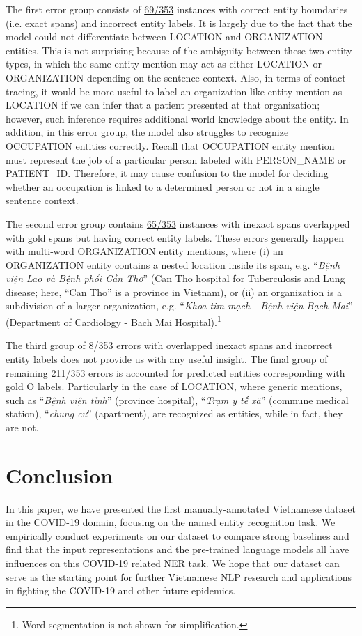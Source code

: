 \documentclass[11pt]{article}
\begin{document}
The first error group consists of \underline{69/353}  instances with correct entity boundaries (i.e. exact spans) and incorrect entity labels. It is largely due to the fact that the model could not differentiate between LOCATION and ORGANIZATION entities. 
This is not surprising because of the ambiguity between these two entity types, in which the same entity mention may act as either LOCATION or ORGANIZATION depending on the sentence context. Also, in terms of contact tracing, it would be more useful to label an organization-like entity mention as LOCATION if we can infer that a patient presented at that organization; however, such inference requires additional world knowledge about the entity. 
In addition, in this error group, the model also struggles to recognize OCCUPATION entities correctly. Recall that OCCUPATION entity mention must represent the job of a particular person labeled with PERSON\_NAME or PATIENT\_ID.
Therefore, it may cause confusion to the model for deciding whether an occupation is linked to a determined person or not in a single sentence context.

The second error group contains \underline{65/353} instances with inexact spans overlapped with gold spans but having correct entity labels. 
These errors generally happen with multi-word ORGANIZATION entity mentions, where (i) an ORGANIZATION entity contains a nested location inside its span, e.g.  ``\textit{Bệnh viện Lao và Bệnh phổi Cần Thơ}'' ({Can Tho hospital for Tuberculosis and Lung disease}; here, ``Can Tho'' is a province in Vietnam), or (ii) an organization is a subdivision of a larger organization, e.g. ``\textit{Khoa tim mạch - Bệnh viện Bạch Mai}'' ({Department of Cardiology - Bach Mai Hospital}).\footnote{Word segmentation is not shown for simplification.}  

The third group of \underline{8/353} errors with overlapped inexact spans and incorrect entity labels does not provide us with any useful insight. 
The final group of remaining \underline{211/353} errors is accounted for predicted entities corresponding with gold O labels. Particularly in the case of LOCATION, where generic mentions, such as  ``\textit{Bệnh viện tỉnh}'' (province hospital), ``\textit{Trạm y tế xã}'' (commune medical station), ``\textit{chung cư}'' (apartment), are recognized as entities, while in fact, they are not.

\section{Conclusion}
\label{conclusion}
In this paper, we have presented the first manually-annotated Vietnamese dataset in the COVID-19 domain, focusing on the named entity recognition task. We empirically conduct experiments on our dataset to compare strong baselines and find that the input representations and the pre-trained language models all have influences on this COVID-19 related NER task. We hope that our dataset can serve as the starting point for further Vietnamese NLP research and  applications in fighting the COVID-19 and other future epidemics. 
\end{document}
